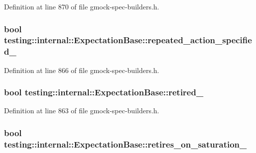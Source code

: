 Definition at line 870 of file gmock-\/spec-\/builders.\+h.

\subsubsection[{\texorpdfstring{repeated\+\_\+action\+\_\+specified\+\_\+}{repeated_action_specified_}}]{\setlength{\rightskip}{0pt plus 5cm}bool testing\+::internal\+::\+Expectation\+Base\+::repeated\+\_\+action\+\_\+specified\+\_\+\hspace{0.3cm}{\ttfamily [protected]}}\hypertarget{classtesting_1_1internal_1_1_expectation_base_abecd382b79252ffc0779d51e058b681c}{}\label{classtesting_1_1internal_1_1_expectation_base_abecd382b79252ffc0779d51e058b681c}


Definition at line 866 of file gmock-\/spec-\/builders.\+h.

\subsubsection[{\texorpdfstring{retired\+\_\+}{retired_}}]{\setlength{\rightskip}{0pt plus 5cm}bool testing\+::internal\+::\+Expectation\+Base\+::retired\+\_\+\hspace{0.3cm}{\ttfamily [protected]}}\hypertarget{classtesting_1_1internal_1_1_expectation_base_a0afd852f5d7863effc3d304dac6a44cf}{}\label{classtesting_1_1internal_1_1_expectation_base_a0afd852f5d7863effc3d304dac6a44cf}


Definition at line 863 of file gmock-\/spec-\/builders.\+h.

\subsubsection[{\texorpdfstring{retires\+\_\+on\+\_\+saturation\+\_\+}{retires_on_saturation_}}]{\setlength{\rightskip}{0pt plus 5cm}bool testing\+::internal\+::\+Expectation\+Base\+::retires\+\_\+on\+\_\+saturation\+\_\+\hspace{0.3cm}{\ttfamily [protected]}}\hypertarget{classtesting_1_1internal_1_1_expectation_base_a74802f3bedf4ab023b30ee6bb275a4d8}{}\label{classtesting_1_1internal_1_1_expectation_base_a74802f3bedf4ab023b30ee6bb275a4d8}


